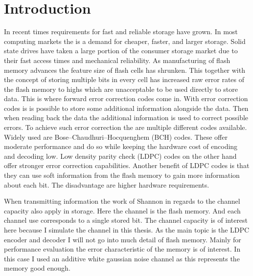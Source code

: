 
\chapter{Introduction}
In recent times requirements for fast and reliable storage have grown. In most computing markets the is a demand for cheaper, faster, and larger storage. Solid state drives have taken a large portion of the consumer storage market due to their fast access times and mechanical reliability. As manufacturing of flash memory advances the feature size of flash cells has shrunken. This together with the concept of storing multiple bits in every cell has increased raw error rates of the flash memory to highs which are unacceptable to be used directly to store data. This is where forward error correction codes come in. With error correction codes is is possible to store some additional information alongside the data. Then when reading back the data the additional information is used to correct possible errors. To achieve such error correction the are multiple different codes available. Widely used are Bose–Chaudhuri–Hocquenghem (BCH) codes. These offer moderate performance and do so while keeping the hardware cost of encoding and decoding low\cite{CaGh17}. Low density parity check (LDPC) codes on the other hand offer stronger error correction capabilities. Another benefit of LDPC codes is that they can use soft information from the flash memory to gain more information about each bit. The disadvantage are higher hardware requirements. 

When transmitting information the work of Shannon in regards to the channel capacity\cite{Sh48} also apply in storage. Here the channel is the flash memory. And each channel use corresponds to a single stored bit. The channel capacity is of interest here because I simulate the channel in this thesis. As the main topic is the LDPC encoder and decoder I will not go into much detail of flash memory. Mainly for performance evaluation the error characteristic of the memory is of interest. In this case I used an additive white gaussian noise channel as this represents the memory good enough.


